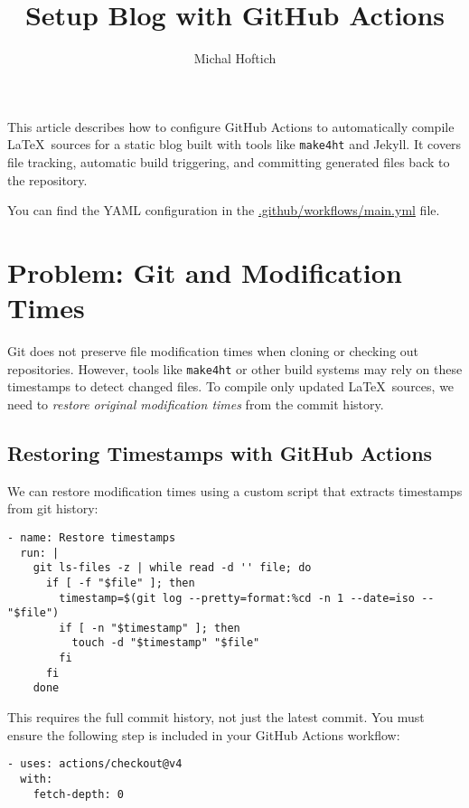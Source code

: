 \documentclass{article}
\title{Setup Blog with GitHub Actions}
\author{Michal Hoftich}
\def\makeht{\texttt{make4ht}}
\begin{document}
\maketitle

This article describes how to configure GitHub Actions to automatically compile \LaTeX\ sources
for a static blog built with tools like \makeht{} and Jekyll. It covers file tracking,
automatic build triggering, and committing generated files back to the repository.

You can find the YAML configuration in the
\href{https://github.com/michal-h21/testblog/blob/main/.github/workflows/main.yml}{.github/workflows/main.yml}
file.

\tableofcontents

\section{Problem: Git and Modification Times}

Git does not preserve file modification times when cloning or checking out repositories.  
However, tools like \makeht{} or other build systems may rely on these timestamps to detect changed files.  
To compile only updated \LaTeX\ sources, we need to \textit{restore original modification times}
from the commit history.

\subsection{Restoring Timestamps with GitHub Actions}

We can restore modification times using a custom script that extracts timestamps from git history:

\begin{verbatim}
- name: Restore timestamps
  run: |
    git ls-files -z | while read -d '' file; do
      if [ -f "$file" ]; then
        timestamp=$(git log --pretty=format:%cd -n 1 --date=iso -- "$file")
        if [ -n "$timestamp" ]; then
          touch -d "$timestamp" "$file"
        fi
      fi
    done
\end{verbatim}

This requires the full commit history, not just the latest commit.
You must ensure the following step is included in your GitHub Actions workflow:

\begin{verbatim}
- uses: actions/checkout@v4
  with:
    fetch-depth: 0
\end{verbatim}
\end{document}

